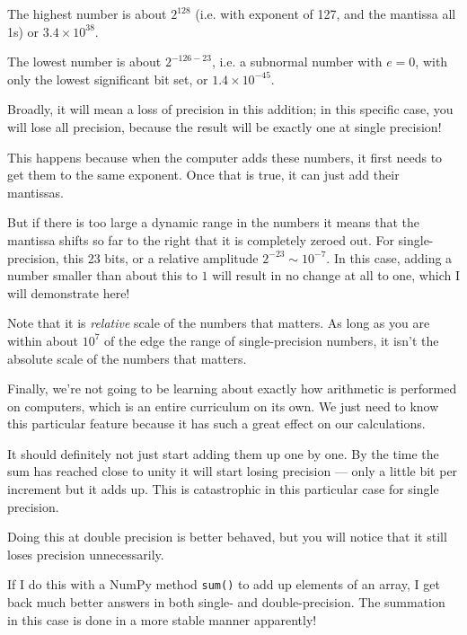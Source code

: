 
\begin{answer}
The highest number is about $2^{128}$ (i.e. with exponent of 127, and
the mantissa all 1s) or $3.4\times 10^{38}$. 

The lowest number is about $2^{-126 -23}$, i.e. a subnormal number
with $e=0$, with only the lowest significant bit set, or $1.4\times
10^{-45}$. 
\end{answer}


\begin{answer}
Broadly, it will mean a loss of precision in this addition; in this
specific case, you will lose all precision, because the result will be
exactly one at single precision!

This happens because when the computer adds these numbers, it first
needs to get them to the same exponent. Once that is true, it can just
add their mantissas. 

But if there is too large a dynamic range in the numbers it means that
the mantissa shifts so far to the right that it is completely zeroed
out. For single-precision, this 23 bits, or a relative amplitude
$2^{-23} \sim 10^{-7}$. In this case, adding a number smaller than
about this to $1$ will result in no change at all to one, which I will
demonstrate here!

Note that it is {\it relative} scale of the numbers that matters. As
long as you are within about $10^7$ of the edge the range of
single-precision numbers, it isn't the absolute scale of the numbers
that matters.

Finally, we're not going to be learning about exactly how arithmetic
is performed on computers, which is an entire curriculum on its own.
We just need to know this particular feature because it has such a
great effect on our calculations.
\end{answer}

  
\begin{answer}
It should definitely not just start adding them up one by one. By the
time the sum has reached close to unity it will start losing precision
--- only a little bit per increment but it adds up. This is
catastrophic in this particular case for single precision.

Doing this at double precision is better behaved, but you will notice
that it still loses precision unnecessarily.

If I do this with a NumPy method {\tt sum()} to add up elements of an
array, I get back much better answers in both single- and
double-precision. The summation in this case is done in a more stable
manner apparently!
\end{answer}

